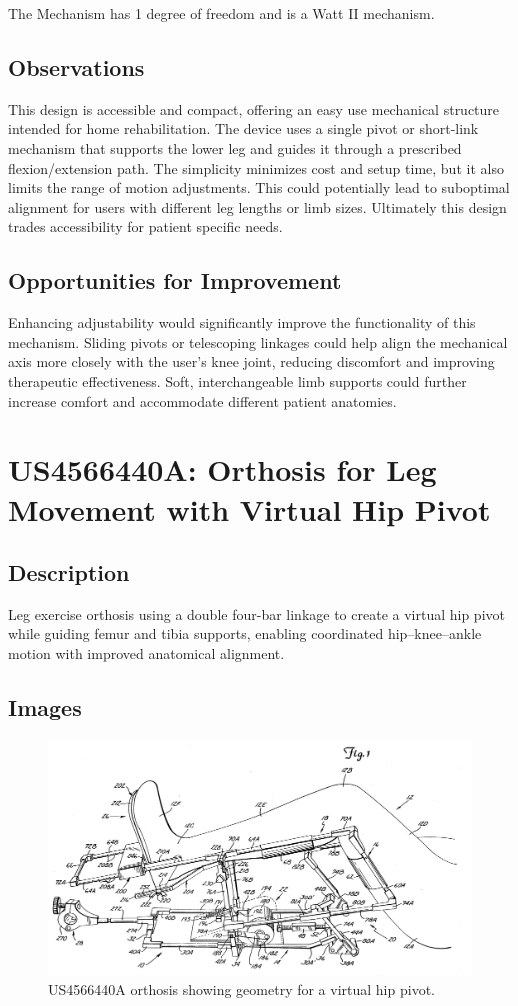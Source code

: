 \documentclass[11pt]{article}
\begin{document}
The Mechanism has 1 degree of freedom and is a Watt II mechanism.

\subsection{Observations}
This design is accessible and compact, offering an easy use mechanical structure intended for home rehabilitation. The device uses a single pivot or short-link mechanism that supports the lower leg and guides it through a prescribed flexion/extension path. The simplicity minimizes cost and setup time, but it also limits the range of motion adjustments. This could potentially lead to suboptimal alignment for users with different leg lengths or limb sizes. Ultimately this design trades accessibility for patient specific needs.

\subsection{Opportunities for Improvement}
Enhancing adjustability would significantly improve the functionality of this mechanism. Sliding pivots or telescoping linkages could help align the mechanical axis more closely with the user's knee joint, reducing discomfort and improving therapeutic effectiveness. Soft, interchangeable limb supports could further increase comfort and accommodate different patient anatomies.

\section{US4566440A: Orthosis for Leg Movement with Virtual Hip Pivot}
\subsection{Description}
Leg exercise orthosis using a double four-bar linkage to create a virtual hip pivot while guiding femur and tibia supports, enabling coordinated hip–knee–ankle motion with improved anatomical alignment.
\subsection{Images}
\begin{figure}[H]
  \centering
  \includegraphics[width=0.54\linewidth]{US4566440_1.png}
  \caption{US4566440A orthosis showing geometry for a virtual hip pivot.}
  \label{fig:US4566440A}
\end{figure}
\end{document}
